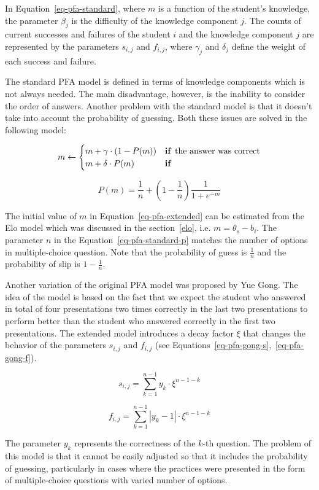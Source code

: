 In Equation~\ref{eq-pfa-standard}, where $m$ is a function of the student's knowledge, the parameter $\beta_j$ is the difficulty of the knowledge component $j$. The counts of current successes and failures of the student $i$ and the knowledge component $j$ are represented by the parameters $s_{i,j}$ and $f_{i,j}$, where $\gamma_j$ and $\delta_j$ define the weight of each success and failure.

The standard PFA model is defined in terms of knowledge components which is not always needed. The main disadvantage, however, is the inability to consider the order of answers. Another problem with the standard model is that it doesn't take into account the probability of guessing. Both these issues are solved in the following model:

\begin{equation} \label{eq-pfa-extended}
  m \gets \begin{cases}
            m + \gamma \cdot (1 - P(m)) & \text{\textbf{if }} \text{the answer was correct} \\
            m + \delta \cdot P(m) & \text{\textbf{if}}
          \end{cases}
\end{equation}

\begin{equation} \label{eq-pfa-standard-p}
  P(m) = \frac{1}{n} + \left(1 - \frac{1}{n}\right)\frac{1}{1 + e^{-m}}
\end{equation}

The initial value of $m$ in Equation~\ref{eq-pfa-extended} can be estimated from the Elo model which was discussed in the section~\ref{elo}, i.e. $m = \theta_s - b_i$. The parameter $n$ in the Equation~\ref{eq-pfa-standard-p} matches the number of options in multiple-choice question. Note that the probability of guess is $\frac{1}{n}$ and the probability of slip is $1 - \frac{1}{n}$.

Another variation of the original PFA model was proposed by Yue Gong. The idea of the model is based on the fact that we expect the student who answered in total of four presentations two times correctly in the last two presentations to perform better than the student who answered correctly in the first two presentations. The extended model introduces a decay factor $\xi$ that changes the behavior of the parameters $s_{i,j}$ and $f_{i,j}$ (see Equations~\ref{eq-pfa-gong-s},~\ref{eq-pfa-gong-f}).


\begin{equation} \label{eq-pfa-gong-s}
  s_{i,j} = \sum_{k=1}^{n-1} y_k \cdot \xi^{n-1-k}
\end{equation}

\begin{equation} \label{eq-pfa-gong-f}
  f_{i,j} = \sum_{k=1}^{n-1} |y_k - 1| \cdot \xi^{n-1-k}
\end{equation}

The parameter $y_k$ represents the correctness of the $k$-th question. 
The problem of this model is that it cannot be easily adjusted so that it includes the probability of guessing, particularly in cases where the practices were presented in the form of multiple-choice questions with varied number of options.
